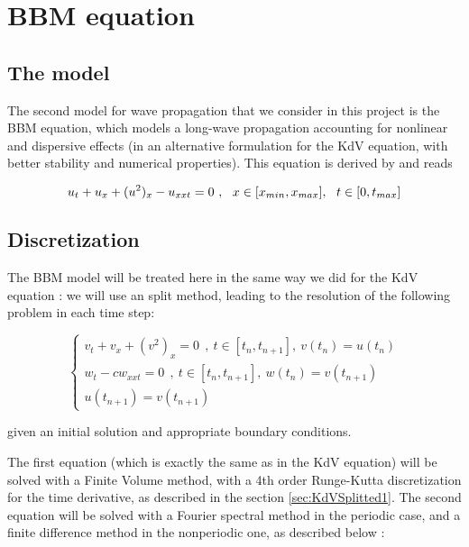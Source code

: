 \section{BBM equation}
\label{sec:BBM}

\subsection{The model}

\indent The second model for wave propagation that we consider in this project is the BBM equation, which models a long-wave propagation accounting for nonlinear and dispersive effects (in an alternative formulation for the KdV equation, with better stability and numerical properties). This equation is derived by \cite{BBM1971} and reads

\begin{equation}
    u_t + u_x + (u^2)_x - u_{xxt} = 0 \ , \ \ x \in [x_{min},x_{max}], \ \ t \in [0, t_{max}] \\
\end{equation}

\subsection{Discretization}

\indent The BBM model will be treated here in the same way we did for the KdV equation : we will use an split method, leading to the resolution of the following problem in each time step: 

\begin{equation}
\begin{cases}
    v_t + v_x + (v^2)_x = 0 \ \ ,\ t \in [t_n,t_{n+1}], \  v(t_n) = u(t_n) \\
    w_t - cw_{xxt} = 0 \ \ , \ t \in [t_n,t_{n+1}], \  w(t_n) = v(t_{n+1}) \\
    u(t_{n+1}) = v(t_{n+1})
\end{cases}
\end{equation}

\noindent given an initial solution and appropriate boundary conditions.

\indent The first equation (which is exactly the same as in the KdV equation) will be solved with a Finite Volume method, with a 4th order Runge-Kutta discretization for the time derivative, as described in the section \ref{sec:KdVSplitted1}.  The second equation will be solved with a Fourier spectral method in the periodic case, and a finite difference method in the nonperiodic one, as described below :

